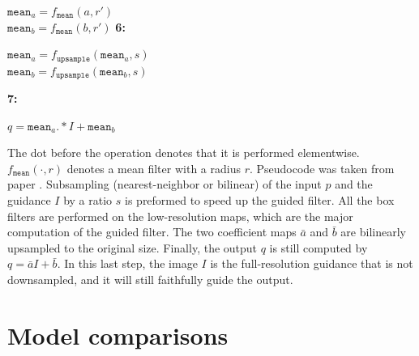 \begin{algorithmic}
{    $\texttt{mean}_a = f_\texttt{mean}(a, r')$ \\
    $\texttt{mean}_b = f_\texttt{mean}(b, r')$
    }
    \vspace{0.1em}
    \State \textbf{6:} \phantom{1}\parbox[t]{\dimexpr\linewidth-\algorithmicindent-1em}{
    $\texttt{mean}_a = f_\texttt{upsample}(\texttt{mean}_a, s)$ \\
    $\texttt{mean}_b = f_\texttt{upsample}(\texttt{mean}_b, s)$
    }
    \vspace{0.1em}
    \State \textbf{7:} \phantom{1}\parbox[t]{\dimexpr\linewidth-\algorithmicindent-1em}{
    $q = \texttt{mean}_a .* I + \texttt{mean}_b$
    }
\end{algorithmic}

\vspace{1em}
The dot before the operation denotes that it is performed elementwise. $f_\texttt{mean}(\cdot, r)$ denotes a mean filter with a radius $r$. Pseudocode was taken from paper \cite{fastguided}. Subsampling (nearest-neighbor or bilinear) of the input $p$ and the guidance $I$ by a ratio $s$ is preformed to speed up the guided filter. All the box filters are performed on the low-resolution maps, which are the major computation of the guided filter. The two coefficient maps $\bar a$ and $\bar b$ are bilinearly upsampled to the original size. Finally, the output $q$ is still computed by $q = \bar aI + \bar b$. In this last step, the image $I$ is the full-resolution guidance that is not downsampled, and it will still faithfully guide the output. \cite{fastguided}

\chapter{Model comparisons}
\label{apx:comparisons}


